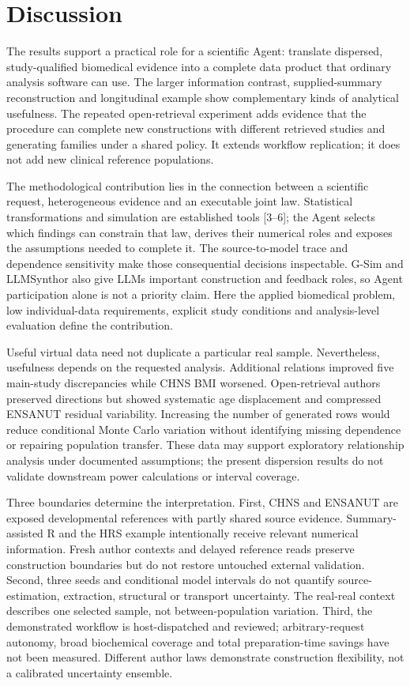 \documentclass[10pt,twocolumn]{article}
\begin{document}
\section{Discussion}

The results support a practical role for a scientific Agent: translate dispersed, study-qualified biomedical evidence into a complete data product that ordinary analysis software can use. The larger information contrast, supplied-summary reconstruction and longitudinal example show complementary kinds of analytical usefulness. The repeated open-retrieval experiment adds evidence that the procedure can complete new constructions with different retrieved studies and generating families under a shared policy. It extends workflow replication; it does not add new clinical reference populations.


The methodological contribution lies in the connection between a scientific request, heterogeneous evidence and an executable joint law. Statistical transformations and simulation are established tools [3–6]; the Agent selects which findings can constrain that law, derives their numerical roles and exposes the assumptions needed to complete it. The source-to-model trace and dependence sensitivity make those consequential decisions inspectable. G-Sim and LLMSynthor also give LLMs important construction and feedback roles, so Agent participation alone is not a priority claim. Here the applied biomedical problem, low individual-data requirements, explicit study conditions and analysis-level evaluation define the contribution.


Useful virtual data need not duplicate a particular real sample. Nevertheless, usefulness depends on the requested analysis. Additional relations improved five main-study discrepancies while CHNS BMI worsened. Open-retrieval authors preserved directions but showed systematic age displacement and compressed ENSANUT residual variability. Increasing the number of generated rows would reduce conditional Monte Carlo variation without identifying missing dependence or repairing population transfer. These data may support exploratory relationship analysis under documented assumptions; the present dispersion results do not validate downstream power calculations or interval coverage.


Three boundaries determine the interpretation. First, CHNS and ENSANUT are exposed developmental references with partly shared source evidence. Summary-assisted R and the HRS example intentionally receive relevant numerical information. Fresh author contexts and delayed reference reads preserve construction boundaries but do not restore untouched external validation. Second, three seeds and conditional model intervals do not quantify source-estimation, extraction, structural or transport uncertainty. The real-real context describes one selected sample, not between-population variation. Third, the demonstrated workflow is host-dispatched and reviewed; arbitrary-request autonomy, broad biochemical coverage and total preparation-time savings have not been measured. Different author laws demonstrate construction flexibility, not a calibrated uncertainty ensemble.
\end{document}
